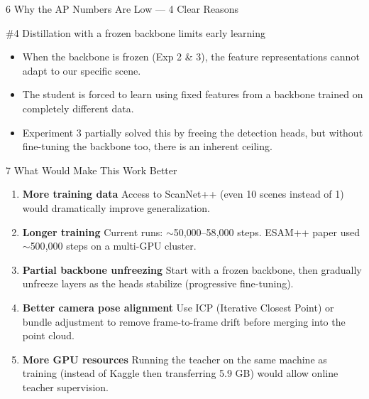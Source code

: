 \documentclass[12pt,a4paper]{article}
\begin{document}
\begin{sectionbox}[warnorange]{6 \quad Why the AP Numbers Are Low — 4 Clear Reasons}
\vspace{6pt}
\begin{diagnosisbox}[warnorange]{\#4 \quad Distillation with a frozen backbone limits early learning}
\begin{itemize}[noitemsep]
  \item When the backbone is frozen (Exp 2 \& 3), the feature representations cannot
        adapt to our specific scene.
  \item The student is forced to learn using fixed features from a backbone trained on
        completely different data.
  \item Experiment 3 partially solved this by freeing the detection heads, but
        without fine-tuning the backbone too, there is an inherent ceiling.
\end{itemize}
\end{diagnosisbox}

\end{sectionbox}

\vspace{10pt}

\begin{sectionbox}[accentgreen]{7 \quad What Would Make This Work Better}

\begin{enumerate}[leftmargin=*, noitemsep]
  \item \textbf{More training data} \quad
        Access to ScanNet++ (even 10 scenes instead of 1) would dramatically
        improve generalization.

  \item \textbf{Longer training} \quad
        Current runs: $\sim$50{,}000--58{,}000 steps.
        ESAM++ paper used $\sim$500{,}000 steps on a multi-GPU cluster.

  \item \textbf{Partial backbone unfreezing} \quad
        Start with a frozen backbone, then gradually unfreeze layers as the heads
        stabilize (progressive fine-tuning).

  \item \textbf{Better camera pose alignment} \quad
        Use ICP (Iterative Closest Point) or bundle adjustment to remove
        frame-to-frame drift before merging into the point cloud.

  \item \textbf{More GPU resources} \quad
        Running the teacher on the same machine as training (instead of Kaggle
        then transferring 5.9 GB) would allow online teacher supervision.
\end{enumerate}

\end{sectionbox}
\end{document}
